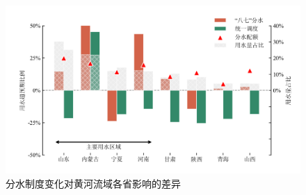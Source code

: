\begin{figure}[!htb]
	\includegraphics[width=\textwidth]{img/ch5/fig3.png}
	\caption[分水制度变化对黄河流域各省影响的差异]{分水制度变化对黄河流域各省影响的差异}\label{fig:regulating}
\end{figure}
